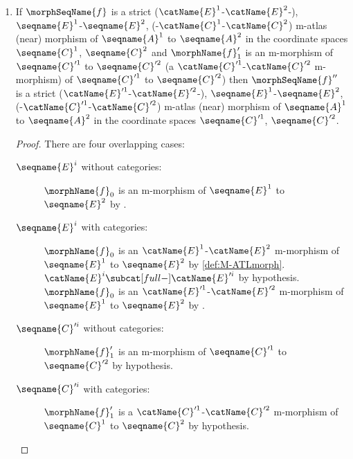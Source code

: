 \documentclass{article}
\begin{document}
\begin{lemma}
\begin{enumerate}
\item
\label{M-ATLmorph:strictmorphisstricttosup}
If $\morphSeqName{f}$ is a strict
\nobreaks
  {
    {($\catName{E}^1$-$\catName{E}^2$-)},
    {$\seqname{E}^1$-$\seqname{E}^2$},
    {(-$\catName{C}^1$-$\catName{C}^2$)}
  }
m-atlas (near) morphism of $\seqname{A}^1$ to $\seqname{A}^2$ in the
coordinate spaces $\seqname{C}^1$, $\seqname{C}^2$ and $\morphName{f}'_1$
is an m-morphism of $\seqname{C}'^1$ to $\seqname{C}'^2$ (a
$\catName{C}'^1$-$\catName{C}'^2$ m-morphism) of $\seqname{C}'^1$ to
$\seqname{C}'^2$) then $\morphSeqName{f}''$ is a strict
\nobreaks
  {
    {($\catName{E}'^1$-$\catName{E}'^2$-)},
    {$\seqname{E}^1$-$\seqname{E}^2$},
    {(-$\catName{C}'^1$-$\catName{C}'^2$)}
  }
m-atlas (near) morphism of $\seqname{A}^1$ to $\seqname{A}^2$ in the
coordinate spaces $\seqname{C}'^1$, $\seqname{C}'^2$.

\begin{proof}
There are four overlapping cases:

\begin{description}
\item[$\seqname{E}^i$ without categories:]
$\morphName{f}_0$ is an m-morphism of $\seqname{E}^1$ to
$\seqname{E}^2$ by .

\item[$\seqname{E}^i$ with categories:]
$\morphName{f}_0$ is an $\catName{E}^1$-$\catName{E}^2$
m-morphism of $\seqname{E}^1$ to $\seqname{E}^2$ by
\cref{def:M-ATLmorph}.
$\catName{E}^i \subcat[full-] \catName{E}'^i$ by hypothesis.
$\morphName{f}_0$ is an $\catName{E}'^1$-$\catName{E}'^2$
m-morphism of $\seqname{E}^1$ to $\seqname{E}^2$ by
.

\item[$\seqname{C}'^i$ without categories:]
$\morphName{f}'_1$ is an m-morphism of $\seqname{C}'^1$ to
$\seqname{C}'^2$ by hypothesis.

\item[$\seqname{C}'^i$ with categories:]
$\morphName{f}'_1$ is a $\catName{C}'^1$-$\catName{C}'^2$
m-morphism of $\seqname{C}^1$ to $\seqname{C}^2$ by hypothesis.
\end{description}
\end{proof}
\end{enumerate}
\end{lemma}
\end{document}
